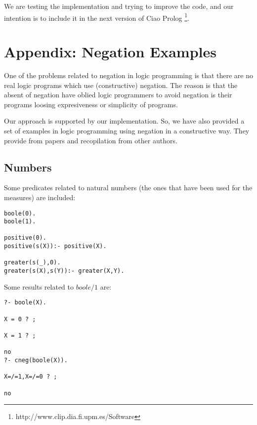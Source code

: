 \documentclass{tlp}
\begin{document}
We are testing the implementation and trying to improve the code, and
our intention is to include it in the next version of Ciao Prolog
\footnote{http://www.clip.dia.fi.upm.es/Software}.
  
\appendix

\section*{Appendix: Negation Examples}

One of the problems related to negation in logic programming is that there are
no real logic programs which use (constructive) negation. The reason is that
the absent of negation have oblied logic programmers to avoid negation is
their programs loosing expresiveness or simplicity of programs.

Our approach is supported by our implementation. So, we have also provided a
set of examples in logic programming using negation in a constructive
way. They provide from papers and recopilation from other authors.

\subsection*{Numbers}

Some predicates related to natural numbers (the ones that have been used for
the measures) are included:
\begin{small}
\begin{verbatim}
boole(0).
boole(1).

positive(0).
positive(s(X)):- positive(X).

greater(s(_),0).
greater(s(X),s(Y)):- greater(X,Y).
\end{verbatim}
\end{small}

Some results related to $boole/1$ are:
\begin{small}
\begin{verbatim}
?- boole(X).

X = 0 ? ;

X = 1 ? ;

no
?- cneg(boole(X)).

X=/=1,X=/=0 ? ;

no
\end{verbatim}
\end{small}
\end{document}
